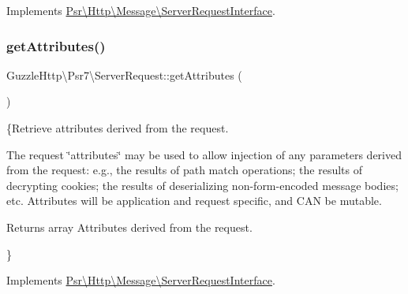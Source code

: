 Implements \hyperlink{interfacePsr_1_1Http_1_1Message_1_1ServerRequestInterface_aa9af3e178ff942e43e9ce6ee82bbaaad}{Psr\textbackslash{}\+Http\textbackslash{}\+Message\textbackslash{}\+Server\+Request\+Interface}.

\mbox{\label{classGuzzleHttp_1_1Psr7_1_1ServerRequest_a0c55ac2643aa033868e1780ffa5456a7}} 
\subsubsection{\texorpdfstring{get\+Attributes()}{getAttributes()}}
{\footnotesize\ttfamily Guzzle\+Http\textbackslash{}\+Psr7\textbackslash{}\+Server\+Request\+::get\+Attributes (\begin{DoxyParamCaption}{ }\end{DoxyParamCaption})}

\{Retrieve attributes derived from the request.

The request \char`\"{}attributes\char`\"{} may be used to allow injection of any parameters derived from the request\+: e.\+g., the results of path match operations; the results of decrypting cookies; the results of deserializing non-\/form-\/encoded message bodies; etc. Attributes will be application and request specific, and C\+AN be mutable.

\begin{DoxyReturn}{Returns}
array Attributes derived from the request.
\end{DoxyReturn}
\} 

Implements \hyperlink{interfacePsr_1_1Http_1_1Message_1_1ServerRequestInterface_a0cda25a9b297c86e7813ffcb98ceb3df}{Psr\textbackslash{}\+Http\textbackslash{}\+Message\textbackslash{}\+Server\+Request\+Interface}.

\mbox{\label{classGuzzleHttp_1_1Psr7_1_1ServerRequest_ad20159691edfb8d604ef055c52191733}} 
